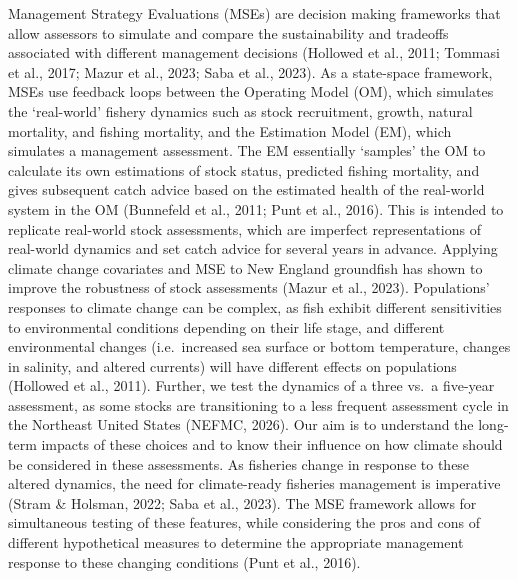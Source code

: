 \documentclass[
  12pt,
]{article}
\begin{document}
Management Strategy Evaluations (MSEs) are decision making frameworks that allow assessors to simulate and compare the sustainability and tradeoffs associated with different management decisions (Hollowed et al., 2011; Tommasi et al., 2017; Mazur et al., 2023; Saba et al., 2023). As a state-space framework, MSEs use feedback loops between the Operating Model (OM), which simulates the `real-world' fishery dynamics such as stock recruitment, growth, natural mortality, and fishing mortality, and the Estimation Model (EM), which simulates a management assessment. The EM essentially `samples' the OM to calculate its own estimations of stock status, predicted fishing mortality, and gives subsequent catch advice based on the estimated health of the real-world system in the OM (Bunnefeld et al., 2011; Punt et al., 2016). This is intended to replicate real-world stock assessments, which are imperfect representations of real-world dynamics and set catch advice for several years in advance. Applying climate change covariates and MSE to New England groundfish has shown to improve the robustness of stock assessments (Mazur et al., 2023). Populations' responses to climate change can be complex, as fish exhibit different sensitivities to environmental conditions depending on their life stage, and different environmental changes (i.e.~increased sea surface or bottom temperature, changes in salinity, and altered currents) will have different effects on populations (Hollowed et al., 2011). Further, we test the dynamics of a three vs.~a five-year assessment, as some stocks are transitioning to a less frequent assessment cycle in the Northeast United States (NEFMC, 2026). Our aim is to understand the long-term impacts of these choices and to know their influence on how climate should be considered in these assessments. As fisheries change in response to these altered dynamics, the need for climate-ready fisheries management is imperative (Stram \& Holsman, 2022; Saba et al., 2023). The MSE framework allows for simultaneous testing of these features, while considering the pros and cons of different hypothetical measures to determine the appropriate management response to these changing conditions (Punt et al., 2016).
\end{document}
